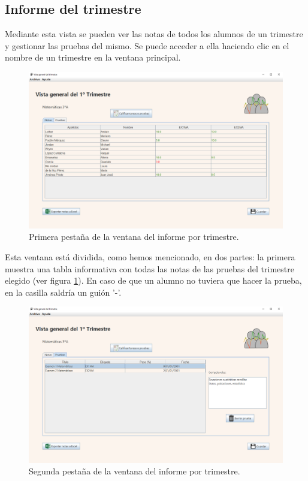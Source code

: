 \subsection{Informe del trimestre}
Mediante esta vista se pueden ver las notas de todos los alumnos de un trimestre y gestionar las pruebas del mismo. Se puede acceder a ella haciendo clic en el nombre de un trimestre en la ventana principal.

\begin{figure}[h]
\centering\includegraphics[width=1\linewidth]{figs/informetrimestre.png}
\caption{Primera pestaña de la ventana del informe por trimestre.}
\label{Fig:informetrimestre}
\end{figure}

Esta ventana está dividida, como hemos mencionado, en dos partes: la primera muestra una tabla informativa con todas las notas de las pruebas del trimestre elegido (ver figura \ref{Fig:informetrimestre}). En caso de que un alumno no tuviera que hacer la prueba, en la casilla saldría un guión '-'. 

\begin{figure}[h]
\centering\includegraphics[width=1\linewidth]{figs/informetrimestre2.png}
\caption{Segunda pestaña de la ventana del informe por trimestre.}
\label{Fig:informetrimestre2}
\end{figure}

